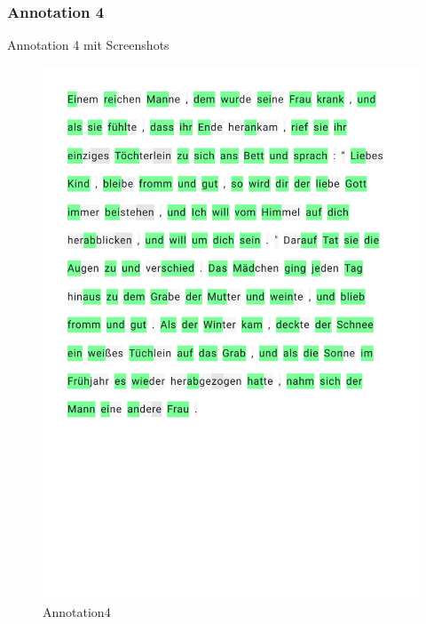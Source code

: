 \subsubsection{Annotation 4}
Annotation 4 mit Screenshots
\begin{figure}[h!]
	\centering
	\includegraphics[width=.7\linewidth, frame]{figures/evaluation/annotation4}
	\caption{Annotation4}
	\label{fig:frontend-home}
\end{figure}
\newpage

